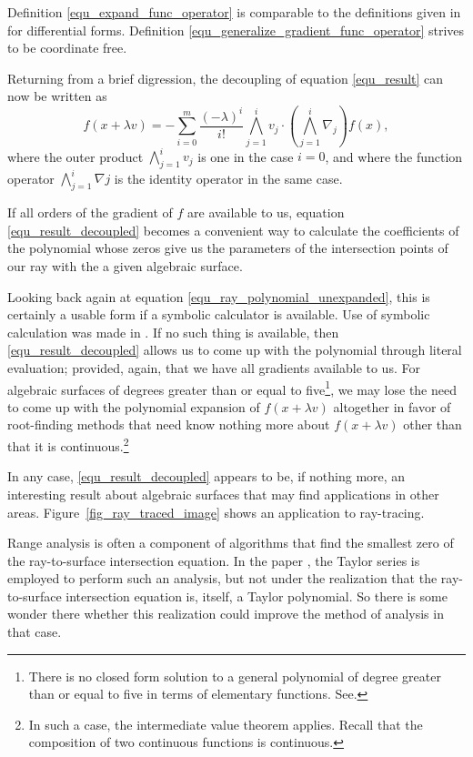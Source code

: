 \documentclass{birkjour}
\theoremstyle{definition}
\theoremstyle{remark}
\numberwithin{equation}{section}
\begin{document}
Definition \eqref{equ_expand_func_operator} is comparable to the
definitions given in \cite{Hestenes93,Macdonald12} for differential forms.
Definition \eqref{equ_generalize_gradient_func_operator} strives to be coordinate free.

Returning from a brief digression, the decoupling of equation \eqref{equ_result} can now be written as
\begin{equation}\label{equ_result_decoupled}
f(x+\lambda v) = -\sum_{i=0}^m\frac{(-\lambda)^i}{i!}\bigwedge_{j=1}^i v_j\cdot\left(\bigwedge_{j=1}^i\nabla_j\right)f(x),
\end{equation}
where the outer product $\bigwedge_{j=1}^i v_j$ is one in the case $i=0$, and where the function
operator $\bigwedge_{j=1}^i\nabla j$ is the identity operator in the same case.

If all orders of the gradient of $f$ are available to us, equation \eqref{equ_result_decoupled} becomes
a convenient way to calculate the coefficients of the polynomial whose zeros give us the parameters of
the intersection points of our ray with the a given algebraic surface.

Looking back again at equation \eqref{equ_ray_polynomial_unexpanded}, this is certainly a usable form
if a symbolic calculator is available.  Use of symbolic calculation was made in \cite{Hanrahan83}.  If no such
thing is available, then \eqref{equ_result_decoupled} allows us to come up with the polynomial
through literal evaluation; provided, again, that we have all gradients available to us.
For algebraic surfaces of degrees greater than or equal to five\footnote{There is no closed form solution
to a general polynomial of degree greater than or equal to five in terms of elementary functions.  See\cite{}.}, we may
lose the need to come up
with the polynomial expansion of $f(x+\lambda v)$ altogether in favor of root-finding methods
that need know nothing more about $f(x+\lambda v)$ other than that it is continuous.\footnote{In such a
case, the intermediate value theorem applies.  Recall that the composition of two continuous functions
is continuous.}

In any case, \eqref{equ_result_decoupled} appears to be, if nothing more, an
interesting result about algebraic surfaces that may find applications in other areas.
Figure~\ref{fig_ray_traced_image} shows an application to ray-tracing.

Range analysis is often a component of algorithms that find the smallest
zero of the ray-to-surface intersection equation.  In the paper \cite{Shou06},
the Taylor series is employed to perform such an analysis, but not under
the realization that the ray-to-surface intersection equation is, itself, a
Taylor polynomial.  So there is some wonder there whether this realization
could improve the method of analysis in that case.




\end{document}
